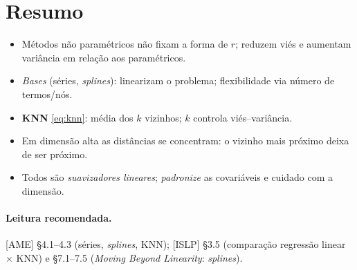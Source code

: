 \documentclass[11pt,a4paper]{article}
\begin{document}
\section*{Resumo}
\begin{itemize}[leftmargin=1.4cm]
  \item Métodos não paramétricos não fixam a forma de $r$; reduzem viés e aumentam
        variância em relação aos paramétricos.
  \item \emph{Bases} (séries, \emph{splines}): linearizam o problema; flexibilidade
        via número de termos/nós.
  \item \textbf{KNN} \eqref{eq:knn}: média dos $k$ vizinhos; $k$ controla
        viés--variância.
  \item Em dimensão alta as distâncias se concentram: o vizinho mais próximo deixa de
        ser próximo.
  \item Todos são \emph{suavizadores lineares}; \emph{padronize} as covariáveis e
        cuidado com a dimensão.
\end{itemize}

\paragraph{Leitura recomendada.} [AME] §4.1--4.3 (séries, \emph{splines}, KNN);
[ISLP] §3.5 (comparação regressão linear $\times$ KNN) e §7.1--7.5
(\emph{Moving Beyond Linearity}: \emph{splines}).
\end{document}
